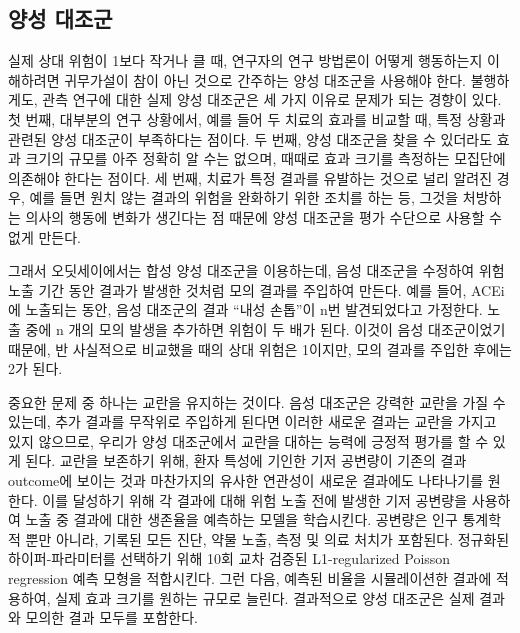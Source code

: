 \documentclass[10.5pt]{book}
\theoremstyle{definition}
\theoremstyle{definition}
\theoremstyle{definition}
\theoremstyle{remark}
\begin{document}
\subsection{양성 대조군}\label{PositiveControls}


실제 상대 위험이 1보다 작거나 클 때, 연구자의 연구 방법론이 어떻게
행동하는지 이해하려면 귀무가설이 참이 아닌 것으로 간주하는 양성 대조군을
사용해야 한다. 불행하게도, 관측 연구에 대한 실제 양성 대조군은 세 가지
이유로 문제가 되는 경향이 있다. 첫 번째, 대부분의 연구 상황에서, 예를
들어 두 치료의 효과를 비교할 때, 특정 상황과 관련된 양성 대조군이
부족하다는 점이다. 두 번째, 양성 대조군을 찾을 수 있더라도 효과 크기의
규모를 아주 정확히 알 수는 없으며, 때때로 효과 크기를 측정하는 모집단에
의존해야 한다는 점이다. 세 번째, 치료가 특정 결과를 유발하는 것으로 널리
알려진 경우, 예를 들면 원치 않는 결과의 위험을 완화하기 위한 조치를 하는
등, 그것을 처방하는 의사의 행동에 변화가 생긴다는 점 때문에 양성
대조군을 평가 수단으로 사용할 수 없게 만든다. \citep{noren_2014}


그래서 오딧세이에서는 합성 양성 대조군을 이용하는데,
\citep{schuemie_2018} 음성 대조군을 수정하여 위험 노출 기간 동안 결과가
발생한 것처럼 모의 결과를 주입하여 만든다. 예를 들어, ACEi에 노출되는
동안, 음성 대조군의 결과 ``내성 손톱''이 n번 발견되었다고 가정한다. 노출
중에 n 개의 모의 발생을 추가하면 위험이 두 배가 된다. 이것이 음성
대조군이었기 때문에, 반 사실적으로 비교했을 때의 상대 위험은 1이지만,
모의 결과를 주입한 후에는 2가 된다.

중요한 문제 중 하나는 교란을 유지하는 것이다. 음성 대조군은 강력한
교란을 가질 수 있는데, 추가 결과를 무작위로 주입하게 된다면 이러한
새로운 결과는 교란을 가지고 있지 않으므로, 우리가 양성 대조군에서 교란을
대하는 능력에 긍정적 평가를 할 수 있게 된다. 교란을 보존하기 위해, 환자
특성에 기인한 기저 공변량이 기존의 결과 outcome에 보이는 것과 마찬가지의
유사한 연관성이 새로운 결과에도 나타나기를 원한다. 이를 달성하기 위해 각
결과에 대해 위험 노출 전에 발생한 기저 공변량을 사용하여 노출 중 결과에
대한 생존율을 예측하는 모델을 학습시킨다. 공변량은 인구 통계학적 뿐만
아니라, 기록된 모든 진단, 약물 노출, 측정 및 의료 처치가 포함된다.
정규화된 하이퍼-파라미터를 선택하기 위해 10회 교차 검증된 L1-regularized
Poisson regression \citep{suchard_2013} 예측 모형을 적합시킨다. 그런
다음, 예측된 비율을 시뮬레이션한 결과에 적용하여, 실제 효과 크기를
원하는 규모로 늘린다. 결과적으로 양성 대조군은 실제 결과와 모의한 결과
모두를 포함한다.
\end{document}
